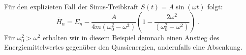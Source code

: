     Für den explizieten Fall der Sinus-Treibkraft $S(t)=A\sin(\omega t)$ folgt:
    \begin{equation}
      \bar H_n = E_n - \frac{A}{4m(\omega_0^2-\omega^2)}\left(1-\frac{2\omega^2}{(\omega_0^2-\omega^2)}\right) \; .
    \end{equation}
    Für $\omega_0^2>\omega^2$ erhalten wir in diesem Beispiel demnach einen Anstieg des Energiemittelwertes gegenüber den Quasienergien, andernfalls eine Absenkung.























































   
